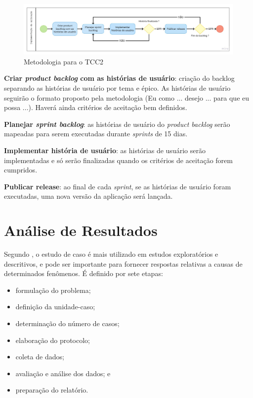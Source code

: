 \begin{figure}[ht]
	\centering
	\includegraphics[keepaspectratio=true,scale=0.29]{figuras/scrummet.pdf}
	\caption{Metodologia para o TCC2}
        \label{fig05}
\end{figure}

\textbf{Criar \emph{product backlog} com as histórias de usuário}: criação do backlog separando as histórias de usuário por tema e épico. As histórias de usuário seguirão 
o formato proposto pela metodologia (Eu como ... desejo ... para que eu possa ...). Haverá ainda critérios de aceitação bem definidos. 

\textbf{Planejar \emph{sprint backlog}}: as histórias de usuário do \emph{product backlog} serão mapeadas para serem executadas durante \emph{sprints} de 15 dias.

\textbf{Implementar história de usuário}: as histórias de usuário serão implementadas e só serão finalizadas quando os critérios de aceitação forem cumpridos.

\textbf{Publicar release}: ao final de cada \emph{sprint}, se as histórias de usuário foram executadas, uma nova versão da aplicação será lançada. 

\section{Análise de Resultados}

Segundo , o estudo de caso é mais utilizado em estudos exploratórios e descritivos, 
e pode ser importante para fornecer respostas relativas a causas de determinados fenômenos. É definido por sete etapas:
\begin{itemize}
	\item formulação do problema;
	\item definição da unidade-caso;
	\item determinação do número de casos;
	\item elaboração do protocolo;
	\item coleta de dados;
	\item avaliação e análise dos dados; e
	\item preparação do relatório.
\end{itemize}

